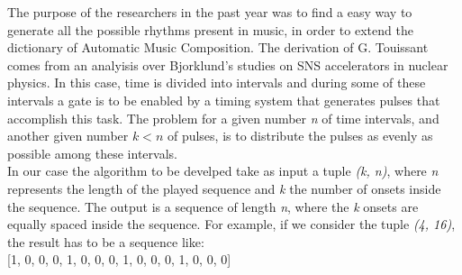 \documentclass[main.tex]{subfiles}
\begin{document}
The purpose of the researchers in the past year was to find a easy way to generate all the possible rhythms present in music, in order to extend the dictionary of Automatic Music Composition\cite{Allouche:2002:AutomSeq:book}.
The derivation of G. Touissant\cite{Toussaint:2004:euclidean:rhythm} comes from an analyisis over Bjorklund's studies on SNS accelerators\cite{Bjorklund:2004:euclidean:rhythm} in nuclear physics. In this case, time is divided into intervals and during some of these intervals a gate is to be enabled by a timing system that generates pulses that accomplish this task. The problem for a given number \textit{n} of time intervals, and another given number \begin{math}k<n\end{math} of pulses, is to distribute the pulses as evenly as possible among these intervals.\\
In our case the algorithm to be develped take as input a tuple \textit{(k, n)}, where \textit{n} represents the length of the played sequence and \textit{k} the number of onsets inside the sequence. The output is a sequence of length \textit{n}, where the \textit{k} onsets are equally spaced inside the sequence. For example, if we consider the tuple \textit{(4, 16)}, the result has to be a sequence like:\\
[2mm]
[1, 0, 0, 0, 1, 0, 0, 0, 1, 0, 0, 0, 1, 0, 0, 0]
\\
\end{document}
